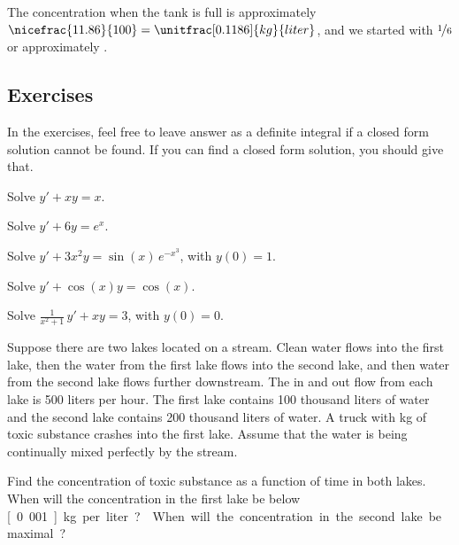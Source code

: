 \begin{example}
The concentration when the tank is full is approximately
$\nicefrac{11.86}{100} = \unitfrac[0.1186]{kg}{liter}$, and we started
with $\nicefrac{1}{6}$ or approximately .
\end{example}

\subsection{Exercises}

In the exercises, feel free to leave answer as a definite integral if a
closed form solution cannot be found.  If you can find a closed form
solution, you should give that.

\begin{exercise}
Solve $y' + xy = x$.
\end{exercise}

\begin{exercise}
Solve $y' + 6y = e^x$.
\end{exercise}

\begin{exercise}
Solve $y' + 3x^2y = \sin(x) \, e^{-x^3}$, with $y(0) = 1$.
\end{exercise}

\begin{exercise}
Solve $y' + \cos (x) y = \cos(x)$.
\end{exercise}

\begin{exercise}
Solve $\frac{1}{x^2+1} \, y' + x y = 3$, with $y(0) = 0$.
\end{exercise}

\begin{exercise}
Suppose there are two lakes located on a stream.  Clean
water flows into the first lake,
then the water from the first lake flows into the second lake, and then
water from the second lake flows further downstream.
The in and out flow from each lake is 500 liters per hour.
The first lake contains 100 thousand liters of water and the
second lake contains 200 thousand liters of water.
A truck with \unit[500]{kg} of toxic substance
crashes into the first lake.  Assume that the water is being continually
mixed perfectly by the stream.
\begin{tasks}
\task Find the concentration of toxic substance
as a function of time in both lakes.
\task When will the
concentration in the first lake be below \unit[0.001]{kg} per liter?
\task When will the
concentration in the second lake be maximal?
\end{tasks}
\end{exercise}

